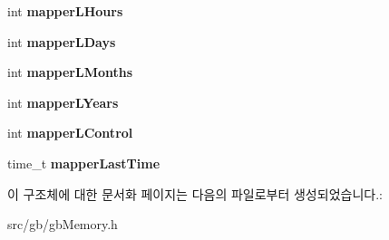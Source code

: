 \begin{DoxyCompactItemize}
int {\bfseries mapper\+L\+Hours}
\item 
\mbox{\label{structmapper_t_a_m_a5_a5bb8ba93e67591444c6f28c7af361d52}} 
int {\bfseries mapper\+L\+Days}
\item 
\mbox{\label{structmapper_t_a_m_a5_ad54677af9a017944377be6f9fe52e51f}} 
int {\bfseries mapper\+L\+Months}
\item 
\mbox{\label{structmapper_t_a_m_a5_aeb81064a3eaeb9934ef2c3ddfef1dad6}} 
int {\bfseries mapper\+L\+Years}
\item 
\mbox{\label{structmapper_t_a_m_a5_a1a6997b47e984b300ba077b1713f9522}} 
int {\bfseries mapper\+L\+Control}
\item 
\mbox{\label{structmapper_t_a_m_a5_a17c496365ad1dc010ae670fb795ad22e}} 
time\+\_\+t {\bfseries mapper\+Last\+Time}
\end{DoxyCompactItemize}


이 구조체에 대한 문서화 페이지는 다음의 파일로부터 생성되었습니다.\+:\begin{DoxyCompactItemize}
\item 
src/gb/gb\+Memory.\+h\end{DoxyCompactItemize}
